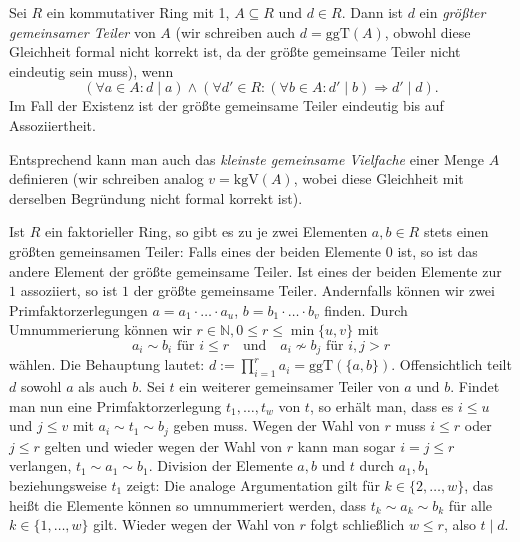 \begin{definition}
    Sei $R$ ein kommutativer Ring mit 1, $A \subseteq R$ und $d \in R$. Dann ist $d$ ein \emph{größter gemeinsamer Teiler} von $A$ (wir schreiben auch $d = \mathrm{ggT}(A)$, obwohl diese Gleichheit formal nicht korrekt ist, da der größte gemeinsame Teiler nicht eindeutig sein muss), wenn
    $$ (\forall a \in A: d \mid a ) \land ( \forall d' \in R : ( \forall b \in A: d' \mid b ) \Rightarrow d' \mid d  ). $$
    Im Fall der Existenz ist der größte gemeinsame Teiler eindeutig bis auf Assoziiertheit.

    Entsprechend kann man auch das \emph{kleinste gemeinsame Vielfache} einer Menge $A$ definieren (wir schreiben  analog $v=\mathrm{kgV}(A)$, wobei diese Gleichheit mit derselben Begründung nicht formal korrekt ist).
\end{definition}

\begin{remark}
    Ist $R$ ein faktorieller Ring, so gibt es zu je zwei Elementen $a,b\in R$ stets einen größten gemeinsamen Teiler: Falls eines der beiden Elemente $0$ ist, so ist das andere Element der größte gemeinsame Teiler. Ist eines der beiden Elemente zur $1$ assoziiert, so ist $1$ der größte gemeinsame Teiler. Andernfalls können wir zwei Primfaktorzerlegungen $a=a_1\cdot\ldots\cdot a_u$, $b=b_1\cdot\ldots\cdot b_v$ finden. Durch Umnummerierung können wir $r\in\mathbb{N}, 0\le r\le \min\{u,v\}$ mit
    $$a_i\sim b_i \text{ für } i\le r\quad \text{und}\quad a_i\not\sim b_j \text{ für } i,j>r$$ wählen.
    Die Behauptung lautet: $d:=\prod_{i=1}^ra_i=\mathrm{ggT}(\{a,b\})$. Offensichtlich teilt $d$ sowohl $a$ als auch $b$. Sei $t$ ein weiterer gemeinsamer Teiler von $a$ und $b$. Findet man nun eine Primfaktorzerlegung $t_1,\ldots,t_w$ von $t$, so erhält man, dass es $i\le u$ und $j\le v$ mit $a_i\sim t_1\sim b_j$ geben muss. Wegen der Wahl von $r$ muss $i\le r$ oder $j\le r$ gelten und wieder wegen der Wahl von $r$ kann man sogar $i=j\le r$ verlangen, \obda $t_1\sim a_1\sim b_1$. Division der Elemente $a,b$ und $t$ durch $a_1,b_1$ beziehungsweise $t_1$ zeigt: Die analoge Argumentation gilt für $k\in\{2,\ldots,w\}$, das heißt die Elemente können so umnummeriert werden, dass $t_k\sim a_k\sim b_k$ für alle $k\in \{1,\ldots,w\}$ gilt. Wieder wegen der Wahl von $r$ folgt schließlich $w\le r$, also $t\mid d$. 
\end{remark}


